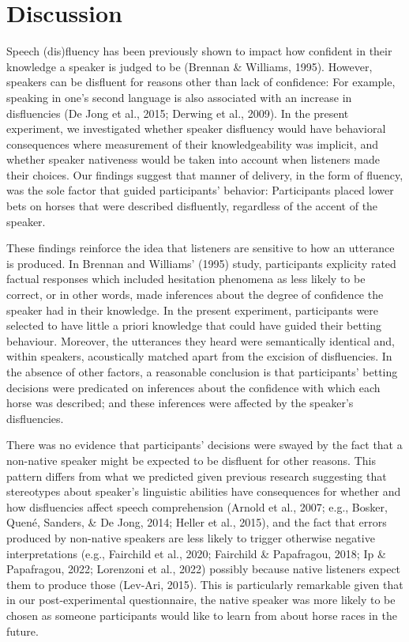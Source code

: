 \documentclass[
  man,floatsintext]{apa7}
\begin{document}
\hypertarget{discussion}{%
\section{Discussion}\label{discussion}}

Speech (dis)fluency has been previously shown to impact how confident in their knowledge a speaker is judged to be (Brennan \& Williams, 1995). However, speakers can be disfluent for reasons other than lack of confidence: For example, speaking in one's second language is also associated with an increase in disfluencies (De Jong et al., 2015; Derwing et al., 2009). In the present experiment, we investigated whether speaker disfluency would have behavioral consequences where measurement of their knowledgeability was implicit, and whether speaker nativeness would be taken into account when listeners made their choices. Our findings suggest that manner of delivery, in the form of fluency, was the sole factor that guided participants' behavior: Participants placed lower bets on horses that were described disfluently, regardless of the accent of the speaker.

These findings reinforce the idea that listeners are sensitive to how an utterance is produced. In Brennan and Williams' (1995) study, participants explicity rated factual responses which included hesitation phenomena as less likely to be correct, or in other words, made inferences about the degree of confidence the speaker had in their knowledge. In the present experiment, participants were selected to have little a priori knowledge that could have guided their betting behaviour. Moreover, the utterances they heard were semantically identical and, within speakers, acoustically matched apart from the excision of disfluencies. In the absence of other factors, a reasonable conclusion is that participants' betting decisions were predicated on inferences about the confidence with which each horse was described; and these inferences were affected by the speaker's disfluencies.

There was no evidence that participants' decisions were swayed by the fact that a non-native speaker might be expected to be disfluent for other reasons. This pattern differs from what we predicted given previous research suggesting that stereotypes about speaker's linguistic abilities have consequences for whether and how disfluencies affect speech comprehension (Arnold et al., 2007; e.g., Bosker, Quené, Sanders, \& De Jong, 2014; Heller et al., 2015), and the fact that errors produced by non-native speakers are less likely to trigger otherwise negative interpretations (e.g., Fairchild et al., 2020; Fairchild \& Papafragou, 2018; Ip \& Papafragou, 2022; Lorenzoni et al., 2022) possibly because native listeners expect them to produce those (Lev-Ari, 2015). This is particularly remarkable given that in our post-experimental questionnaire, the native speaker was more likely to be chosen as someone participants would like to learn from about horse races in the future.
\end{document}
